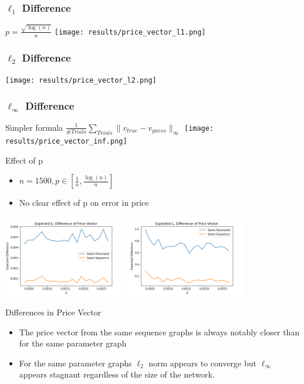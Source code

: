 \documentclass[a4paper,12pt]{beamer}
\begin{document}
\begin{frame}
  \frametitle{$\ell_{1}$ Difference}
  $p=\frac{\sqrt{\log(n)}}{n}$
  \texttt{[image: results/price\_vector\_l1.png]}
\end{frame}

\begin{frame}
  \frametitle{$\ell_{2}$ Difference}
  \texttt{[image: results/price\_vector\_l2.png]}
\end{frame}

\begin{frame}
  \frametitle{$\ell_{\infty}$ Difference}
  Simpler formula $\frac{1}{\# Trials} \sum_{Trials} \| v_{true} - v_{guess} \|_{\infty}$
  \texttt{[image: results/price\_vector\_inf.png]}
\end{frame}

\begin{frame}{Effect of p}
  \begin{itemize}
    \item $n=1500, p \in [\frac{1}{n}, \frac{\log(n)}{n}]$
    \item No clear effect of p on error in price
  \end{itemize}
  \includegraphics[width=0.4\textwidth]{results/vdif_vp_l2.png}
  \includegraphics[width=0.4\textwidth]{results/vdif_vp_inf.png}
\end{frame}

\begin{frame}{Differences in Price Vector}
  \begin{itemize}
    \item The price vector from the same sequence graphs is always notably closer than for the same parameter graph \\
    \item For the same parameter graphs $\ell_{2}$ norm appears to converge but $\ell_{\infty}$ appears stagnant regardless of the size of the network.
  \end{itemize}
  \end{frame}
\end{document}
